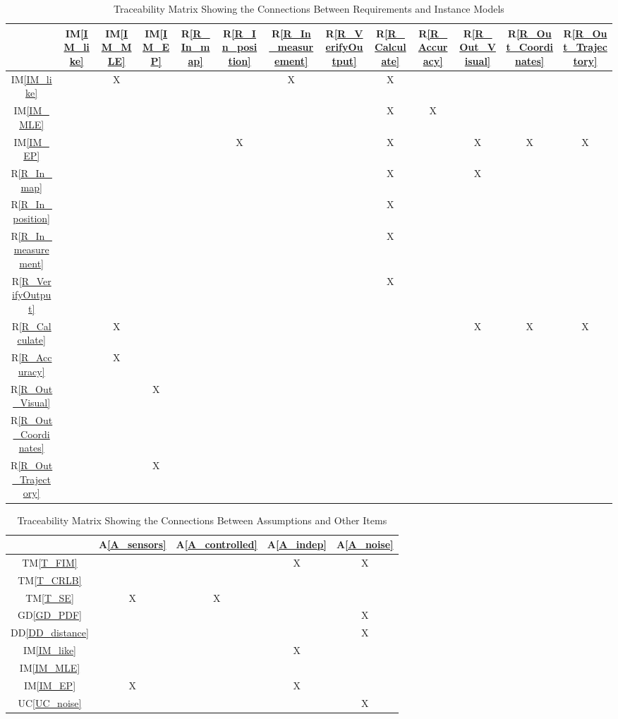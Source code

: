 \documentclass[12pt]{article}
\newcommand{\dref}[1]{GD\ref{#1}}
\newcommand{\ddref}[1]{DD\ref{#1}}
\newcommand{\tref}[1]{TM\ref{#1}}
\newcommand{\aref}[1]{A\ref{#1}}
\newcommand{\iref}[1]{IM\ref{#1}}
\newcommand{\rref}[1]{R\ref{#1}}
\newcommand{\ucref}[1]{UC\ref{#1}}
\begin{document}
\begin{table}[H]
\centering
\begin{tabular}{|c|c|c|c|c|c|c|c|c|c|c|c|c|}
\hline
	& \iref{IM_like}& \iref{IM_MLE}& \iref{IM_EP}& \rref{R_In_map}& \rref{R_In_position}&\rref{R_In_measurement}& \rref{R_VerifyOutput}& \rref{R_Calculate}& \rref{R_Accuracy}& \rref{R_Out_Visual}& \rref{R_Out_Coordinates} & \rref{R_Out_Trajectory}\\
\hline
\iref{IM_like}                & & X& & & & X& & X& & & &\\ \hline
\iref{IM_MLE}                 & & & & & & & & X& X& & &\\ \hline
\iref{IM_EP}                  & & & & & X& & & X& & X& X&X\\ \hline
\rref{R_In_map}               & & & & & & & & X& & X& &\\ \hline
\rref{R_In_position}          & & & & & & & & X& & & &\\ \hline
\rref{R_In_measurement}       & & & & & & & & X& & & &\\ \hline
\rref{R_VerifyOutput}         & & & & & & & & X& & & &\\ \hline
\rref{R_Calculate}            & &X & & & & & & & & X& X&X\\ \hline
\rref{R_Accuracy}             & &X & & & & & & & & & &\\ \hline
\rref{R_Out_Visual}           & & & X& & & & & & & & &\\ \hline
\rref{R_Out_Coordinates}      & & & & & & & & & & & &\\ \hline
\rref{R_Out_Trajectory}       & & & X& & & & & & & & &\\
\hline
\end{tabular}
\caption{Traceability Matrix Showing the Connections Between Requirements and Instance Models}
\label{Table:R_trace}
\end{table}

\begin{table}[H]
\centering
\begin{tabular}{|c|c|c|c|c|}
\hline
	& \aref{A_sensors}& \aref{A_controlled}& \aref{A_indep}& \aref{A_noise} \\
\hline
\tref{T_FIM}         & & &X &X  \\ \hline
\tref{T_CRLB}        & & & &  \\ \hline
\tref{T_SE}          &X &X & &  \\ \hline
\dref{GD_PDF}        & & & & X \\ \hline
\ddref{DD_distance}  & & & &X \\ \hline
\iref{IM_like}       & & &X & \\ \hline
\iref{IM_MLE}        & & & & \\ \hline
\iref{IM_EP}        &X & &X & \\ \hline
\ucref{UC_noise}     & & & &X\\
\hline
\end{tabular}
\caption{Traceability Matrix Showing the Connections Between Assumptions and Other Items}
\label{Table:A_trace}
\end{table}

\clearpage



\end{document}
